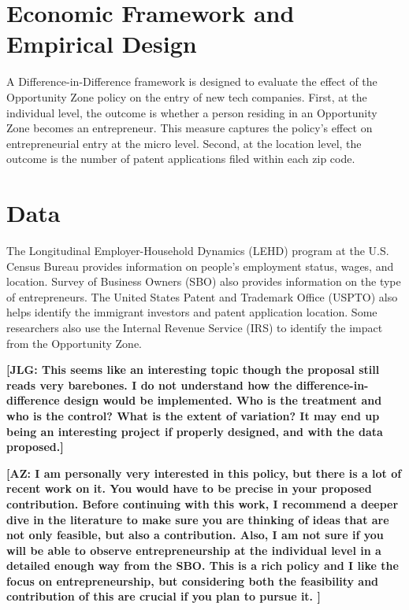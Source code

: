 \section{Economic Framework and Empirical Design}
A Difference-in-Difference framework is designed to evaluate the effect of the Opportunity Zone policy on the entry of new tech companies. First, at the individual level, the outcome is whether a person residing in an Opportunity Zone becomes an entrepreneur. This measure captures the policy’s effect on entrepreneurial entry at the micro level. Second, at the location level, the outcome is the number of patent applications filed within each zip code. 

\section{Data}
The Longitudinal Employer-Household Dynamics (LEHD) program at the U.S. Census Bureau provides information on people's employment status, wages, and location.  Survey of Business Owners (SBO) also provides information on the type of entrepreneurs. The United States Patent and Trademark Office (USPTO) also helps identify the immigrant investors and patent application location. Some researchers also use the Internal Revenue Service (IRS) to identify the impact from the Opportunity Zone.

\bigskip 

\noindent \textbf{[JLG: This seems like an interesting topic though the proposal still reads very barebones. I do not understand how the difference-in-difference design would be implemented. Who is the treatment and who is the control? What is the extent of variation? It may end up being an interesting project if properly designed, and with the data proposed.]}

\vspace{3em}

\noindent \textbf{[AZ: I am personally very interested in this policy, but there is a lot of recent work on it. You would have to be precise in your proposed contribution. Before continuing with this work, I recommend a deeper dive in the literature to make sure you are thinking of ideas that are not only feasible, but also a contribution. Also, I am not sure if you will be able to observe entrepreneurship at the individual level in a detailed enough way from the SBO. This is a rich policy and I like the focus on entrepreneurship, but considering both the feasibility and contribution of this are crucial if you plan to pursue it. ]}

 




